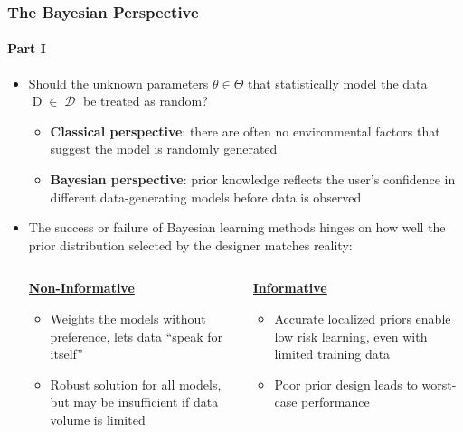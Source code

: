 \documentclass[aspectratio=169,usenames,dvipsnames]{beamer}
\DeclareMathOperator{\Drm}{\mathrm{D}}
\DeclareMathOperator{\Dcal}{\mathcal{D}}
\begin{document}
\begin{frame}
\frametitle{The Bayesian Perspective}
\framesubtitle{Part I}

\begin{itemize}
\item Should the unknown parameters $\theta \in \Theta$ that statistically model the data $\Drm \in \Dcal$ be treated as random?
	\vspace{0.25em}
	\begin{itemize}
	\item \textbf{Classical perspective}: there are often no environmental factors that suggest the model is randomly generated
	\vspace{0.25em}
	\item \textbf{Bayesian perspective}: prior knowledge reflects the user's confidence in different data-generating models before data is observed 
	\end{itemize}
\vspace{0.5em}
\item The success or failure of Bayesian learning methods hinges on how well the \alert{prior distribution} selected by the designer matches reality:

\vspace{0.5em}
\begin{columns}[T]


\begin{column}{.5\textwidth}

\centering
\large \textbf{\underline{Non-Informative}} \normalsize
\vspace{0.1em}
\begin{itemize}
\item Weights the models without preference, lets data ``speak for itself''
\item Robust solution for all models, but may be insufficient if data volume is limited
\end{itemize}

\end{column}

\vrule

\begin{column}{.5\textwidth}

\centering
\large \textbf{\underline{Informative}} \normalsize
\vspace{0.1em}
\begin{itemize}
\item Accurate localized priors enable low risk learning, even with limited training data
\item Poor prior design leads to worst-case performance
\end{itemize}


\end{column}

\end{columns}

\end{itemize}
\vspace{0.5em}

\end{frame}
\end{document}
